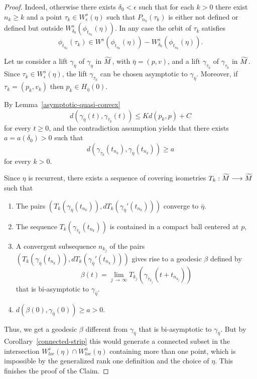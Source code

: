\documentclass[10pt]{amsart}
\theoremstyle{definition}
\let\oldtilde\tilde
\renewcommand*{\tilde}[1]{\mathchoice{\widetilde{#1}}{\widetilde{#1}}{\oldtilde{#1}}{\oldtilde{#1}}}
\begin{document}
\begin{proof}
Indeed, otherwise there exists $\delta_{0} < \epsilon$ such that for each $k>0$ there exist $n_{k} \geq k$ and a point $\tau_{k} \in W^{s}_{\epsilon}(\eta)$ such that $P_{n_{k}}(\tau_{k}) $ is either not defined or defined but outside $W^{s}_{\delta_{0}}(\phi_{t_{n_{k}}}(\eta))$. In any case the orbit of $\tau_{k}$ satisfies
\[
\phi_{t_{n_{k}}}(\tau_{k}) \in W^{s}\left(\phi_{t_{n_{k}}}(\eta)\right) - W^{s}_{\delta_{0}}\left(\phi_{t_{n_{k}}}(\eta)\right).
\]

Let us consider a lift $\gamma_{\bar{\eta}}$ of $\gamma_{\eta}$ in $\tilde{M}$, with $\bar{\eta}= (p,v)$, and a lift $\gamma_{\bar{\tau}_{k}}$ of $\gamma_{\tau_{k}}$ in $\tilde{M}$. Since $\tau_{k} \in W^{s}_{\epsilon}(\eta)$, the lift $\gamma_{\bar{\tau}_{k}}$ can be chosen asymptotic to $\gamma_{\bar{\eta}}$. Moreover, if $\tau_{k} = (p_{k}, v_{k})$ then $p_{k} \in H_{\bar{\eta}}(0)$.

By Lemma~\ref{asymptotic-quasi-convex}
\[
d\left(\gamma_{\bar{\eta}}(t), \gamma_{\bar{\tau}_{k}}(t)\right) \leq Kd(p_{k}, p) +C
\]
for every $t \geq 0$,
and the contradiction assumption yields that there exists $a = a(\delta_{0}) >0$ such that
\[
d\left(\gamma_{\bar{\tau}_{k}}(t_{n_{k}}), \gamma_{\bar{\eta}}(t_{n_{k}})\right) \geq a
\]
for every $k>0 $.

Since $\eta$ is recurrent, there exists a sequence of covering isometries $T_{k}: \tilde{M} \longrightarrow \tilde{M}$ such that
\begin{enumerate}
\item \label{proof-lemm8.3.1} The pairs $(T_{k}(\gamma_{\bar{\eta}}(t_{n_{k}})), dT_{k}(\gamma_{\bar{\eta}}'(t_{n_{k}})))$ converge to $\bar{\eta}$.
\item \label{proof-lemm8.3.2} The sequence $T_{k}(\gamma_{\bar{\tau}_{k}}(t_{n_{k}})) $ is contained in a compact ball centered at $p$,
\item \label{proof-lemm8.3.3} A convergent subsequence $n_{k_{j}}$ of the pairs $(T_{k}(\gamma_{\bar{\eta}}(t_{n_{k}})), dT_{k}(\gamma_{\bar{\eta}}'(t_{n_{k}})))$ gives rise to a geodesic $\beta$ defined by
\[
\beta(t) = \lim_{j\,\rightarrow\,\infty} T_{k_{j}}\left(\gamma_{\bar{\tau}_{k_{j}}}\left(t+t_{n_{k_{j}}}\right)\right)
\]
that is bi-asymptotic to $\gamma_{\bar{\eta}}$.
\item $d(\beta(0), \gamma_{\bar{\eta}}(0)) \geq a >0$.
\end{enumerate}

Thus, we get a geodesic $\beta$ different from $\gamma_{\bar{\eta}}$ that is bi-asymptotic to $\gamma_{\bar{\eta}}$. But by Corollary~\ref{connected-strip} this would generate a connected subset in the intersection $W^{s}_{loc}(\eta) \cap W^{u}_{loc}(\eta)$ containing more than one point, which is impossible by the generalized rank one definition and the choice of $\eta$. This finishes the proof of the Claim.
\end{proof}
\end{document}
